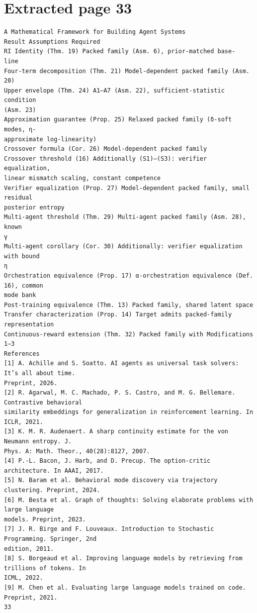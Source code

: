 \documentclass[11pt]{article}
\begin{document}
\section*{Extracted page 33}
\begin{verbatim}
A Mathematical Framework for Building Agent Systems
Result Assumptions Required
RI Identity (Thm. 19) Packed family (Asm. 6), prior-matched base-
line
Four-term decomposition (Thm. 21) Model-dependent packed family (Asm. 20)
Upper envelope (Thm. 24) A1–A7 (Asm. 22), sufficient-statistic condition
(Asm. 23)
Approximation guarantee (Prop. 25) Relaxed packed family (δ-soft modes, η-
approximate log-linearity)
Crossover formula (Cor. 26) Model-dependent packed family
Crossover threshold (16) Additionally (S1)–(S3): verifier equalization,
linear mismatch scaling, constant competence
Verifier equalization (Prop. 27) Model-dependent packed family, small residual
posterior entropy
Multi-agent threshold (Thm. 29) Multi-agent packed family (Asm. 28), known
γ
Multi-agent corollary (Cor. 30) Additionally: verifier equalization with bound
η
Orchestration equivalence (Prop. 17) α-orchestration equivalence (Def. 16), common
mode bank
Post-training equivalence (Thm. 13) Packed family, shared latent space
Transfer characterization (Prop. 14) Target admits packed-family representation
Continuous-reward extension (Thm. 32) Packed family with Modifications 1–3
References
[1] A. Achille and S. Soatto. AI agents as universal task solvers: It’s all about time.
Preprint, 2026.
[2] R. Agarwal, M. C. Machado, P. S. Castro, and M. G. Bellemare. Contrastive behavioral
similarity embeddings for generalization in reinforcement learning. In ICLR, 2021.
[3] K. M. R. Audenaert. A sharp continuity estimate for the von Neumann entropy. J.
Phys. A: Math. Theor., 40(28):8127, 2007.
[4] P.-L. Bacon, J. Harb, and D. Precup. The option-critic architecture. In AAAI, 2017.
[5] N. Baram et al. Behavioral mode discovery via trajectory clustering. Preprint, 2024.
[6] M. Besta et al. Graph of thoughts: Solving elaborate problems with large language
models. Preprint, 2023.
[7] J. R. Birge and F. Louveaux. Introduction to Stochastic Programming. Springer, 2nd
edition, 2011.
[8] S. Borgeaud et al. Improving language models by retrieving from trillions of tokens. In
ICML, 2022.
[9] M. Chen et al. Evaluating large language models trained on code. Preprint, 2021.
33
\end{verbatim}

\clearpage
\end{document}
